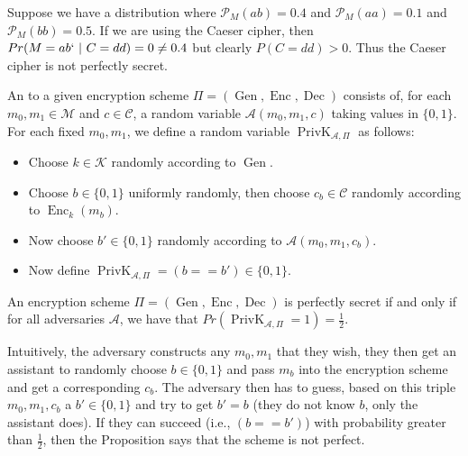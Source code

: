 \documentclass[twoside, a4paper, 10pt]{amsart}
\begin{document}
\begin{eg} Suppose we have a distribution where $\mathcal{P}_M(ab) = 0.4$ and $\mathcal{P}_M(aa) = 0.1$ and $\mathcal{P}_M(bb) = 0.5$. If we are using the Caeser cipher, then $Pr(M = ab `~|~ C = dd) = 0 \neq 0.4$ but clearly $P(C=dd) >0$. Thus the Caeser cipher is not perfectly secret.  

\end{eg}

\begin{mydef}[Adversary] An  to a given encryption scheme $\Pi = (\operatorname{Gen}, \operatorname{Enc}, \operatorname{Dec})$ consists of, for each $m_0,m_1 \in \mathcal{M}$ and $c \in \mathcal{C}$, a random variable $\mathcal{A}(m_0, m_1, c)$ taking values in $\{0,1\}$. For each fixed $m_0,m_1$, we define a random variable $\operatorname{PrivK}_{\mathcal{A}, \Pi}$ as follows:

\begin{itemize}
	\item Choose $k \in \mathcal{K}$ randomly according to $\operatorname{Gen}$.
	\item Choose $b \in \{0,1\}$ uniformly randomly, then choose $c_b \in \mathcal{C}$ randomly according to $\operatorname{Enc}_k(m_b)$.
	\item Now choose $b' \in \{0,1\}$ randomly according to $\mathcal{A}(m_0, m_1, c_b)$.
	\item Now define $\operatorname{PrivK}_{\mathcal{A}, \Pi} = (b == b') \in \{0,1\}$.
\end{itemize}

\end{mydef}

\begin{prop} An encryption scheme $\Pi = (\operatorname{Gen}, \operatorname{Enc}, \operatorname{Dec})$ is perfectly secret if and only if for all adversaries $\mathcal{A}$, we have that $Pr(\operatorname{PrivK}_{\mathcal{A}, \Pi} = 1) = \frac{1}{2}. $

\end{prop}

Intuitively, the adversary constructs any $m_0,m_1$ that they wish, they then get an assistant to randomly choose $b \in \{0,1\}$ and pass $m_b$ into the encryption scheme and get a corresponding $c_b$. The adversary then has to guess, based on this triple $m_0, m_1, c_b$ a $b' \in \{0,1\}$ and try to get $b' = b$ (they do not know $b$, only the assistant does). If they can succeed (i.e., $(b == b')$) with probability greater than $\frac{1}{2}$, then the Proposition says that the scheme is not perfect.
\end{document}

